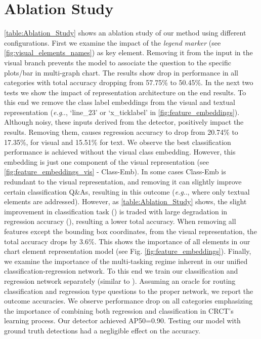 \documentclass[runningheads]{llncs}
\makeatletter
\newcommand\our[1][]{CRCT\xspace}
\DeclareRobustCommand\onedot{\futurelet\@let@token\@onedot}
\def\@onedot{\ifx\@let@token.\else.\null\fi\xspace}
\def\eg{\emph{e.g}\onedot} \def\Eg{\emph{E.g}\onedot}
\makeatother
\begin{document}
\section{Ablation Study}
 \cref{table:Ablation_Study} shows an ablation study of our method using different configurations. First we examine the impact of the {\it legend marker} (see \cref{fig:visual_elements_names}) as key element. Removing it from the input in the visual branch prevents the model to associate the question to the specific plots/bar in multi-graph chart. The results show drop in performance in all categories with total accuracy dropping from 57.75\% to 50.45\%. In the next two tests we show the impact of representation architecture on the end results. To this end we remove the class label embeddings from the visual and textual representation (\eg, `line\_23' or `x\_ticklabel' in \cref{fig:feature_embeddings}). Although noisy, these inputs derived from the detector, positively impact the results. Removing them, causes regression accuracy to drop from 20.74\% to 17.35\%, for visual and 15.51\% for text. We observe the best classification performance is achieved without the visual class embedding. However, this embedding is just one component of the visual representation (see \cref{fig:feature_embeddings_vis} - Class-Emb). In some cases Class-Emb is redundant to the visual representation, and removing it can slightly improve certain classification Q\&As, resulting in this outcome (\eg, where only textual elements are addressed). However, as \cref{table:Ablation_Study} shows, the slight improvement in classification task () is traded with large degradation in regression accuracy (), resulting a lower total accuracy.
When removing all features except the bounding box coordinates, from the visual representation, the total accuracy drops by 3.6\%. This shows the importance of all elements in our chart element representation model (see Fig. \ref{fig:feature_embeddings}). Finally, we examine the importance of the multi-tasking regime inherent in our unified classification-regression network. To this end we train our classification and regression network separately (similar to \cite{plotqa}). Assuming an oracle for routing classification and regression type questions to the proper network, we report the outcome accuracies. We observe performance drop on all categories emphasizing the importance of combining both regression and classification in \our's learning process. Our detector achieved AP50=0.90. Testing our model with ground truth detections had a negligible effect on the accuracy.
 
\end{document}
